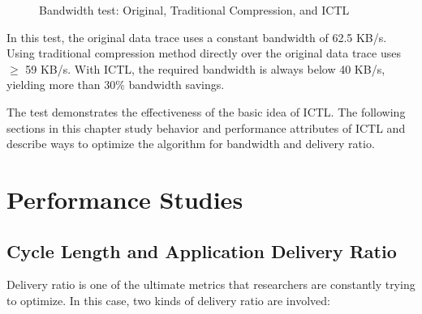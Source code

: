 \documentclass[12pt]{report}
\begin{document}
\begin{figure}[h]
  \caption{\label{fig:first_glance}Bandwidth test: Original, Traditional Compression, and ICTL }
\end{figure}

In this test, the original data trace uses a constant bandwidth of 62.5 KB/s. Using traditional compression method directly over the original data trace uses $\ge$ 59 KB/s. With ICTL, the required bandwidth is always below 40 KB/s, yielding more than 30\% bandwidth savings.

The test demonstrates the effectiveness of the basic idea of ICTL. The following sections in this chapter study behavior and performance attributes of ICTL and describe ways to optimize the algorithm for bandwidth and delivery ratio.


\section{Performance Studies}

\subsection{Cycle Length and Application Delivery Ratio}
\label{sec:cl_adr}

Delivery ratio is one of the ultimate metrics that researchers are constantly trying to optimize. In this case, two kinds of delivery ratio are involved:
\end{document}
